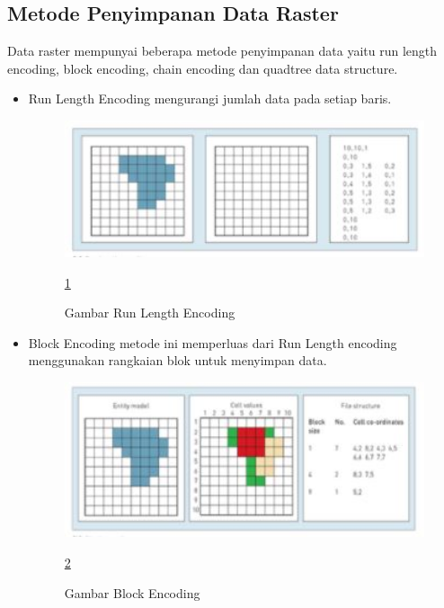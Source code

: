 \subsection{Metode Penyimpanan Data Raster}
Data raster mempunyai beberapa metode penyimpanan data yaitu run length encoding, block encoding, chain encoding dan quadtree data structure.
	\begin{itemize}
		\item  Run Length Encoding
				mengurangi jumlah data pada setiap baris.
				\begin{figure} [ht]
					\centerline{\includegraphics[width=1\textwidth]{figures/runlengthencoding.JPG}}
					\caption{Gambar Run Length Encoding}
					\label{runlengthencoding}
					\ref{runlengthencoding}
				\end{figure}

		\item  Block Encoding
				metode ini memperluas dari Run Length encoding menggunakan rangkaian blok untuk menyimpan data.
				\begin{figure} [ht]
					\centerline{\includegraphics[width=1\textwidth]{figures/blockencoding.JPG}}
					\caption{Gambar Block Encoding}
					\label{blockencoding}
					\ref{blockencoding}
				\end{figure}


\end{itemize}
